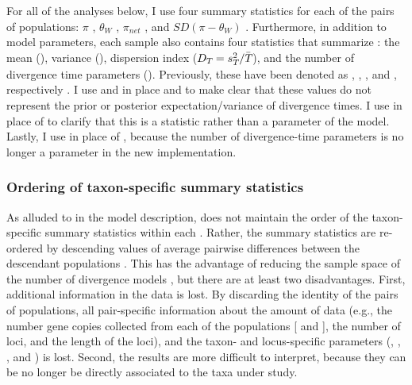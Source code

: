 For all of the analyses below, I use four summary statistics for each of
the pairs of populations:
$\pi$ \cite{Tajima1983}, $\theta_W$ \cite{Watterson1975}, $\pi_{net}$
\cite{Takahata1985}, and $SD(\pi-\theta_W)$ \cite{Tajima1989}.
Furthermore, in addition to model parameters, each sample \hpvector{}
also contains four statistics that summarize \divTimeMapVector:
the mean (\divTimeMean), variance (\divTimeVar), dispersion index
($D_{T_{}} = s^{2}_{T_{}}/\bar{T_{}}$), and the number
of divergence time parameters (\divTimeNum).
Previously, these have been denoted as \meant{}{}, \vart{}{}, \vmratio{}, and
\numt{}, respectively \cite{Hickerson2006,Huang2011,Oaks2012}.
I use \divTimeMean and \divTimeVar in place \meant{}{} and \vart{}{} to make
clear that these values do not represent the prior or posterior
expectation/variance of divergence times.
I use \divTimeDispersion in place of \vmratio{} to clarify that this is a
statistic rather than a parameter of the model.
Lastly, I use \divTimeNum in place of \numt{}, because the number of
divergence-time parameters is no longer a parameter in the new implementation.

\subsubsection{Ordering of taxon-specific summary statistics}
As alluded to in the model description, \msb does not maintain the order of the
taxon-specific summary statistics \alignmentSS{}{} within each \ssVector{}.
Rather, the summary statistics are re-ordered by descending values of average
pairwise differences between the descendant populations
\cite[$\pi_b$;]{NeiLi1979,Huang2011}.
This has the advantage of reducing the sample space of the number of
divergence models \divTimeIndexVector, but there are at least two disadvantages.
First, additional information in the data is lost.
By discarding the identity of the \npairs{} pairs of populations, all
pair-specific information about the amount of data (e.g., the number gene
copies collected from each of the populations [ and
], the number of loci, and the length of the loci), and the
taxon- and locus-specific parameters (\hkyModel{}{},
\mutationRateScalarConstant{}{}, \ploidyScalar{}{}, and
\locusMutationRateScalar{}) is lost.
Second, the results are more difficult to interpret, because they can be no
longer be directly associated to the taxa under study.

